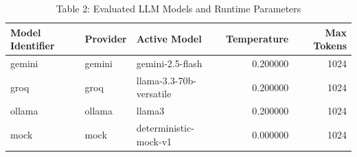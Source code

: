 \begin{table}
\caption{Table 2: Evaluated LLM Models and Runtime Parameters}
\label{tab:table2_model_configuration}
\begin{tabular}{lllrr}
\toprule
Model Identifier & Provider & Active Model & Temperature & Max Tokens \\
\midrule
gemini & gemini & gemini-2.5-flash & 0.200000 & 1024 \\
groq & groq & llama-3.3-70b-versatile & 0.200000 & 1024 \\
ollama & ollama & llama3 & 0.200000 & 1024 \\
mock & mock & deterministic-mock-v1 & 0.000000 & 1024 \\
\bottomrule
\end{tabular}
\end{table}
